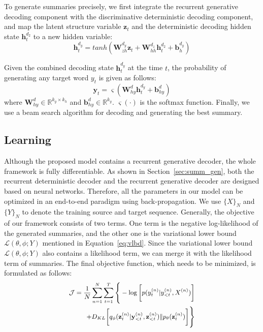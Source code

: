 \documentclass[11pt,letterpaper]{article}
\begin{document}
To generate summaries precisely, we first integrate the recurrent generative decoding component with the discriminative deterministic decoding component, and map the latent structure variable $\mathbf{z}_t$ and the deterministic decoding hidden state $\mathbf{h}_t^{d_2}$ to a new hidden variable:
\begin{equation}
{\mathbf{h}_{t}^{d_y}} = tanh({\mathbf{W}_{zh}^{d_y}}\mathbf{z}_{t} +
{\mathbf{W}_{hh}^{d_z}}\mathbf{h}_{t}^{d_2} + {\mathbf{b}^{d_y}_h})
\end{equation}

Given the combined decoding state $\mathbf{h}_{t}^{d_y}$ at the time $t$, the probability of generating any target word $y_t$ is given as follows:
\begin{equation}
\mathbf{y}_t = \varsigma({\mathbf{W}_{hy}^{d}}\mathbf{h}_{t}^{d_y} + {\mathbf{b}^{d}_{hy}})
\end{equation}
where ${\mathbf{W}_{hy}^{d}} \in \mathbb{R}^{k_y \times k_h}$ and ${\mathbf{b}^{d}_{hy}} \in \mathbb{R}^{k_y}$. $\varsigma(\cdot)$ is the softmax function.
Finally, we use a beam search algorithm \cite{koehn2004pharaoh} for decoding and generating the best summary.

\subsection{Learning}
Although the proposed model contains a recurrent generative decoder, the whole framework is fully differentiable. As shown in Section~\ref{sec:summ_gen}, both the recurrent deterministic decoder and the recurrent generative decoder are designed based on neural networks. Therefore, all the parameters in our model can be optimized in an end-to-end paradigm using back-propagation.
We use  $\{X\}_N$ and $\{Y\}_N$ to denote the training source and target sequence.
Generally, the objective of our framework consists of two terms.
One term is the negative log-likelihood of the generated summaries, and the other one is the variational lower bound $\mathcal{L}(\theta ,\phi ;Y)$ mentioned in Equation~\ref{eq:vlbd}.
Since the variational lower bound $\mathcal{L}(\theta ,\phi ;Y)$ also contains a likelihood term, we can merge it with the likelihood term of summaries.
The final objective function, which needs to be minimized, is formulated as follows:
\begin{equation}
\small
\begin{split}
\mathcal{J} = \frac{1}{N}\sum\limits_{n = 1}^N \sum\limits_{t = 1}^T  \Bigg\{ -\log \bigg[p(y_t^{(n)}|y_{ < t}^{(n)},{X^{(n)}})\bigg] \\
+ {D_{KL}}\bigg[{q_\phi }(\mathbf{z}_t^{(n)}|\mathbf{y}_{ < t}^{(n)},\mathbf{z}_{ < t}^{(n)})\|{p_\theta }(\mathbf{z}_t^{(n)})\bigg] \Bigg\} 
\end{split}
\label{eq:obj}
\end{equation} 
\end{document}
